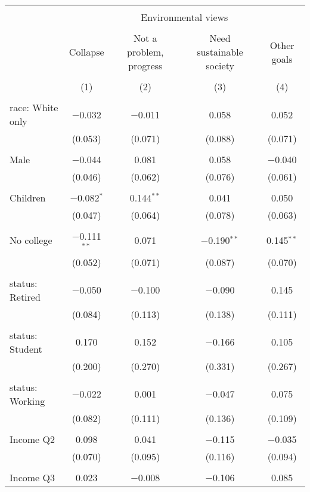 
\begin{tabular}{@{\extracolsep{5pt}}lcccc} 
\\[-1.8ex]\hline 
\hline \\[-1.8ex] 
 & \multicolumn{4}{c}{Environmental views} \\ 
\cline{2-5} 
\\[-1.8ex] & Collapse & Not a problem, progress & Need sustainable society & Other goals \\ 
\\[-1.8ex] & (1) & (2) & (3) & (4)\\ 
\hline \\[-1.8ex] 
 race: White only & $-$0.032 & $-$0.011 & 0.058 & 0.052 \\ 
  & (0.053) & (0.071) & (0.088) & (0.071) \\ 
  & & & & \\ 
 Male & $-$0.044 & 0.081 & 0.058 & $-$0.040 \\ 
  & (0.046) & (0.062) & (0.076) & (0.061) \\ 
  & & & & \\ 
 Children & $-$0.082$^{*}$ & 0.144$^{**}$ & 0.041 & 0.050 \\ 
  & (0.047) & (0.064) & (0.078) & (0.063) \\ 
  & & & & \\ 
 No college & $-$0.111$^{**}$ & 0.071 & $-$0.190$^{**}$ & 0.145$^{**}$ \\ 
  & (0.052) & (0.071) & (0.087) & (0.070) \\ 
  & & & & \\ 
 status: Retired & $-$0.050 & $-$0.100 & $-$0.090 & 0.145 \\ 
  & (0.084) & (0.113) & (0.138) & (0.111) \\ 
  & & & & \\ 
 status: Student & 0.170 & 0.152 & $-$0.166 & 0.105 \\ 
  & (0.200) & (0.270) & (0.331) & (0.267) \\ 
  & & & & \\ 
 status: Working & $-$0.022 & 0.001 & $-$0.047 & 0.075 \\ 
  & (0.082) & (0.111) & (0.136) & (0.109) \\ 
  & & & & \\ 
 Income Q2 & 0.098 & 0.041 & $-$0.115 & $-$0.035 \\ 
  & (0.070) & (0.095) & (0.116) & (0.094) \\ 
  & & & & \\ 
 Income Q3 & 0.023 & $-$0.008 & $-$0.106 & 0.085 \\ 

\end{tabular}
